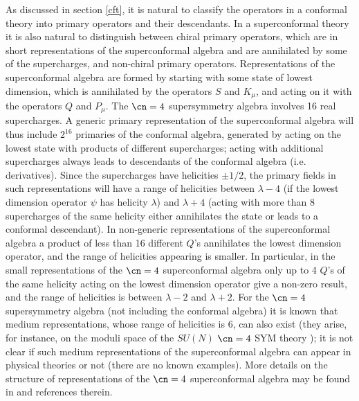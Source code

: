 As discussed in section \ref{cft}, it is natural to classify the
operators in a conformal theory into primary operators and their
descendants. In a superconformal theory it is also natural to
distinguish between chiral primary operators, which are in short
representations of the superconformal algebra and are annihilated by
some of the supercharges, and non-chiral primary operators.
Representations of the superconformal algebra are formed by starting
with some state of lowest dimension, which is annihilated by the
operators $S$ and $K_\mu$, and acting on it with the operators $Q$ and
$P_\mu$.  The $\cn=4$ supersymmetry algebra involves 16 real
supercharges.  A generic primary representation of the superconformal
algebra will thus include $2^{16}$ primaries of the conformal algebra,
generated by acting on the lowest state with products of different
supercharges;
acting with additional supercharges always leads to descendants of the
conformal algebra (i.e. derivatives). Since the supercharges have
helicities $\pm 1/2$, the primary fields in such representations will
have a range of helicities between $\lambda-4$ (if the lowest
dimension operator $\psi$ has helicity $\lambda$) and $\lambda+4$
(acting with more than 8 supercharges of the same helicity either
annihilates the state or leads to a conformal descendant). In
non-generic representations of the superconformal algebra a product of
less than 16 different $Q$'s annihilates the lowest dimension
operator, and the range of helicities appearing is smaller. In
particular, in the small representations of the $\cn=4$ superconformal
algebra only up to 4 $Q$'s of the same helicity acting on the lowest
dimension operator give a non-zero result, and the range of helicities
is between $\lambda-2$ and $\lambda+2$. For the $\cn=4$ supersymmetry
algebra (not including the conformal algebra) it is known that medium
representations, whose range of helicities is 6, can also exist (they
arise, for instance, on the moduli space of the $SU(N)$ $\cn=4$ SYM
theory \cite{Bergman:1997yw,Hashimoto:1998zs,Kawano:1998bp,
Bergman:1998gs,Hashimoto:1998nj,Lee:1998nv,Sasakura:1998cx,Tong:1999mg}); 
it is not clear if such medium representations of the
superconformal algebra \cite{Gunaydin:1998jc} 
can appear in physical theories or not
(there are no known examples). More details on the structure of
representations of the $\cn=4$ superconformal algebra may be found in
\cite{Gunaydin:1985fk,Andrianopoli:1998jh,Andrianopoli:1998nc,
Ferrara:1998pr,Gunaydin:1998sw,Andrianopoli:1998ut,Gunaydin:1998jc}
and references therein.

